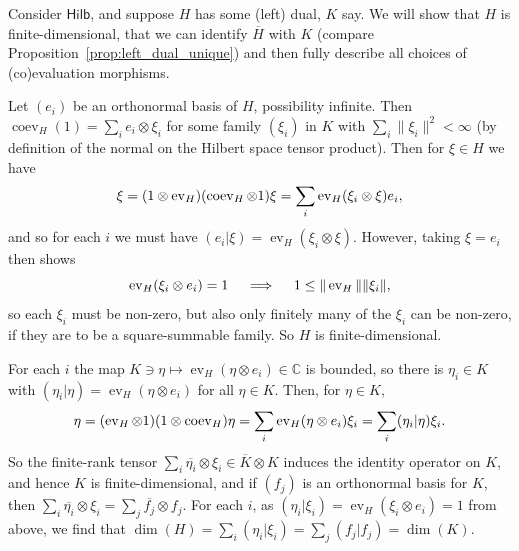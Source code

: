 \documentclass[a4paper,11pt]{article}
\theoremstyle{plain}
\theoremstyle{remark}
\newenvironment{example}
  {\pushQED{\qed}\renewcommand{\qedsymbol}{$\triangle$}\examplex}
  {\popQED\endexamplex}
\newcommand{\catHilb}{\textsf{Hilb}}
\newcommand{\ev}{\operatorname{ev}}
\newcommand{\coev}{\operatorname{coev}}
\begin{document}
\begin{example}\label{eg:hilbfd_rigid_diffmaps}
Consider $\catHilb$, and suppose $H$ has some (left) dual, $K$ say.  We will show that $H$ is finite-dimensional, that we can identify $\overline H$ with $K$ (compare Proposition~\ref{prop:left_dual_unique}) and then fully describe all choices of (co)evaluation morphisms.

Let $(e_i)$ be an orthonormal basis of $H$, possibility infinite.  Then $\coev_H(1) = \sum_i e_i \otimes \xi_i$ for some family $(\xi_i)$ in $K$ with $\sum_i \|\xi_i\|^2 < \infty$ (by definition of the normal on the Hilbert space tensor product).  Then for $\xi\in H$ we have
\begin{equation}
\xi = (1\otimes\ev_H)(\coev_H\otimes 1)\xi = \sum_i \ev_H(\xi_i\otimes\xi) e_i, \notag
\end{equation}
and so for each $i$ we must have $(e_i|\xi) = \ev_H(\xi_i\otimes\xi)$.  However, taking $\xi=e_i$ then shows
\begin{equation}
\ev_H(\xi_i\otimes e_i) = 1 \quad\implies\quad 1 \leq \|\ev_H\| \|\xi_i\|, \notag
\end{equation}
so each $\xi_i$ must be non-zero, but also only finitely many of the $\xi_i$ can be non-zero, if they are to be a square-summable family.  So $H$ is finite-dimensional.

For each $i$ the map $K\ni \eta \mapsto \ev_H(\eta\otimes e_i) \in\mathbb C$ is bounded, so there is $\eta_i\in K$ with $(\eta_i|\eta) = \ev_H(\eta\otimes e_i)$ for all $\eta\in K$.  Then, for $\eta\in K$,
\begin{equation}
\eta = (\ev_H\otimes 1)(1\otimes\coev_H)\eta = \sum_i \ev_H(\eta\otimes e_i) \xi_i
= \sum_i (\eta_i|\eta) \xi_i. \notag
\end{equation}
So the finite-rank tensor $\sum_i \overline{\eta_i} \otimes \xi_i \in \overline{K} \otimes K$ induces the identity operator on $K$, and hence $K$ is finite-dimensional, and if $(f_j)$ is an orthonormal basis for $K$, then $\sum_i \overline{\eta_i} \otimes \xi_i = \sum_j \overline{f_j} \otimes f_j$.  For each $i$, as $(\eta_i|\xi_i) = \ev_H(\xi_i\otimes e_i) = 1$ from above, we find that $\dim(H) = \sum_i (\eta_i|\xi_i) = \sum_j (f_j|f_j) = \dim(K)$.


\end{example}
\end{document}

